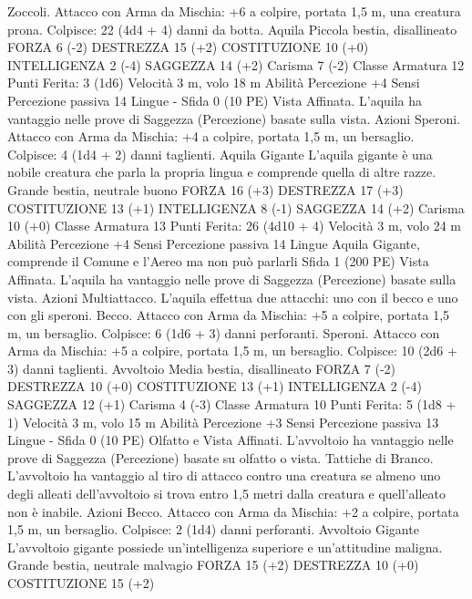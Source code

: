 \begin{multicols}{2}
Zoccoli. Attacco con Arma da Mischia: +6 a colpire, portata 1,5
m, una creatura prona.
Colpisce: 22 (4d4 + 4) danni da botta.
Aquila
Piccola bestia, disallineato
FORZA 6 (-2)
DESTREZZA 15 (+2)
COSTITUZIONE 10 (+0)
INTELLIGENZA 2 (-4)
SAGGEZZA 14 (+2)
Carisma 7 (-2)
Classe Armatura 12
\hspace*{0pt}\hfill{Punti Ferita}: 3 (1d6)
Velocità 3 m, volo 18 m
Abilità Percezione +4
Sensi Percezione passiva 14
Lingue -
Sfida 0 (10 PE)
Vista Affinata. L’aquila ha vantaggio nelle prove di Saggezza
(Percezione) basate sulla vista.
Azioni
Speroni. Attacco con Arma da Mischia: +4 a colpire, portata 1,5
m, un bersaglio.
Colpisce: 4 (1d4 + 2) danni taglienti.
Aquila Gigante
L’aquila gigante è una nobile creatura che parla la
propria lingua e comprende quella di altre razze.
Grande bestia, neutrale buono
FORZA 16 (+3)
DESTREZZA 17 (+3)
COSTITUZIONE 13 (+1)
INTELLIGENZA 8 (-1)
SAGGEZZA 14 (+2)
Carisma 10 (+0)
Classe Armatura 13
\hspace*{0pt}\hfill{Punti Ferita}: 26 (4d10 + 4)
Velocità 3 m, volo 24 m
Abilità Percezione +4
Sensi Percezione passiva 14
Lingue Aquila Gigante, comprende il Comune e l’Aereo ma non
può parlarli
Sfida 1 (200 PE)
Vista Affinata. L’aquila ha vantaggio nelle prove di Saggezza
(Percezione) basate sulla vista.
Azioni
Multiattacco. L’aquila effettua due attacchi: uno con il becco e
uno con gli speroni.
Becco. Attacco con Arma da Mischia: +5 a colpire, portata 1,5
m, un bersaglio.
Colpisce: 6 (1d6 + 3) danni perforanti.
Speroni. Attacco con Arma da Mischia: +5 a colpire, portata 1,5
m, un bersaglio.
Colpisce: 10 (2d6 + 3) danni taglienti.
Avvoltoio
Media bestia, disallineato
FORZA 7 (-2)
DESTREZZA 10 (+0)
COSTITUZIONE 13 (+1)
INTELLIGENZA 2 (-4)
SAGGEZZA 12 (+1)
Carisma 4 (-3)
Classe Armatura 10
\hspace*{0pt}\hfill{Punti Ferita}: 5 (1d8 + 1)
Velocità 3 m, volo 15 m
Abilità Percezione +3
Sensi Percezione passiva 13
Lingue -
Sfida 0 (10 PE)
Olfatto e Vista Affinati. L’avvoltoio ha vantaggio nelle prove di
Saggezza (Percezione) basate su olfatto o vista.
Tattiche di Branco. L’avvoltoio ha vantaggio al tiro di attacco
contro una creatura se almeno uno degli alleati dell’avvoltoio si
trova entro 1,5 metri dalla creatura e quell’alleato non è inabile.
Azioni
Becco. Attacco con Arma da Mischia: +2 a colpire, portata 1,5
m, un bersaglio.
Colpisce: 2 (1d4) danni perforanti.
Avvoltoio Gigante
L’avvoltoio gigante possiede un’intelligenza superiore e
un’attitudine maligna.
Grande bestia, neutrale malvagio
FORZA 15 (+2)
DESTREZZA 10 (+0)
COSTITUZIONE 15 (+2)

\end{multicols}
